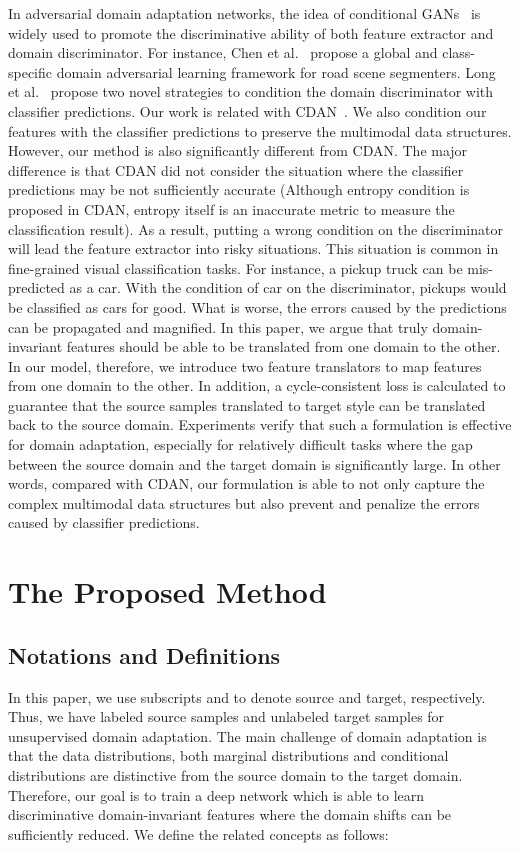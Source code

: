 \documentclass[sigconf]{acmart}
\begin{document}
In adversarial domain adaptation networks, the idea of conditional GANs~\cite{mirza2014conditional} is widely used to promote the discriminative ability of both feature extractor and domain discriminator. For instance, Chen et al.~\cite{chen2017no} propose a global and class-specific domain adversarial learning framework for road scene segmenters. Long et al.~\cite{long2018conditional} propose two novel strategies to condition the domain discriminator with classifier predictions. Our work is related with CDAN~\cite{long2018conditional}. We also condition our features with the classifier predictions to preserve the multimodal data structures. However, our method is also significantly different from CDAN. The major difference is that CDAN did not consider the situation where the classifier predictions may be not sufficiently accurate (Although entropy condition is proposed in CDAN, entropy itself is an inaccurate metric to measure the classification result). As a result, putting a wrong condition on the discriminator will lead the feature extractor into risky situations. This situation is common in fine-grained visual classification tasks. For instance, a pickup truck can be mis-predicted as a car. With the condition of car on the discriminator, pickups would be classified as cars for good. What is worse, the errors caused by the predictions can be propagated and magnified. In this paper, we argue that truly domain-invariant features should be able to be translated from one domain to the other. In our model, therefore, we introduce two feature translators to map features from one domain to the other. In addition, a cycle-consistent loss is calculated to guarantee that the source samples translated to target style can be translated back to the source domain. Experiments verify that such a formulation is effective for domain adaptation, especially for relatively difficult tasks where the gap between the source domain and the target domain is significantly large. In other words, compared with CDAN, our formulation is able to not only capture the complex multimodal data structures but also prevent and penalize the errors caused by classifier predictions.




\section{The Proposed Method}
\subsection{Notations and Definitions}
In this paper, we use subscripts  and  to denote source and target, respectively. Thus, we have  labeled source samples  and  unlabeled target samples  for unsupervised domain adaptation. The main challenge of domain adaptation is that the data distributions, both marginal distributions  and conditional distributions  are distinctive from the source domain to the target domain. Therefore, our goal is to train a deep network  which is able to learn discriminative domain-invariant features where the domain shifts can be sufficiently reduced. We define the related concepts as follows:
\end{document}
